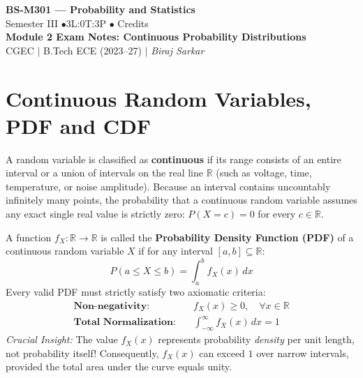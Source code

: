\documentclass[12pt,a4paper]{article}
\begin{document}
\begin{center}
  {\LARGE\bfseries\color{myred} BS-M301 --- Probability and Statistics}\\[5pt]
  {\normalsize\color{mydark} Semester III \quad$\bullet$\quad 3L:0T:3P \quad$\bullet$ Credits}\\[3pt]
  {\normalsize\color{myteal}\textbf{Module 2 Exam Notes: Continuous Probability Distributions}}\\[3pt]
  {\small\color{mydark} CGEC \;$|$\; B.Tech ECE (2023--27) \;$|$\; \textit{Biraj Sarkar}}
\end{center}
\vspace{2pt}
\noindent{\color{myred}\rule{\linewidth}{1.5pt}}
\vspace{2pt}

\hypersetup{linkcolor=mydark}
\tableofcontents
\hypersetup{linkcolor=myteal}
\newpage

\section{Continuous Random Variables, PDF and CDF}

A random variable is classified as \textbf{continuous} if its range consists of an entire interval or a union of intervals on the real line $\mathbb{R}$ (such as voltage, time, temperature, or noise amplitude). Because an interval contains uncountably infinitely many points, the probability that a continuous random variable assumes any exact single real value is strictly zero: $P(X = c) = 0$ for every $c \in \mathbb{R}$.

\begin{tcolorbox}[defbox, title={\textbf{Definition: Probability Density Function (PDF)}}]
A function $f_X: \mathbb{R} \to \mathbb{R}$ is called the \textbf{Probability Density Function (PDF)} of a continuous random variable $X$ if for any interval $[a, b] \subseteq \mathbb{R}$:
\begin{equation}
  P(a \le X \le b) = \int_a^b f_X(x) \, dx
\end{equation}
Every valid PDF must strictly satisfy two axiomatic criteria:
\begin{align}
  \textbf{Non-negativity:} \quad & f_X(x) \ge 0, \quad \forall x \in \mathbb{R} \\[4pt]
  \textbf{Total Normalization:} \quad & \int_{-\infty}^\infty f_X(x) \, dx = 1
\end{align}
\textit{Crucial Insight:} The value $f_X(x)$ represents probability \textit{density} per unit length, not probability itself! Consequently, $f_X(x)$ can exceed $1$ over narrow intervals, provided the total area under the curve equals unity.
\end{tcolorbox}
\end{document}
